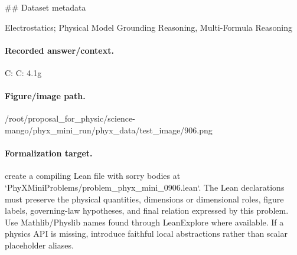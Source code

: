 \#\# Dataset metadata

Electrostatics; Physical Model Grounding Reasoning, Multi-Formula Reasoning

\paragraph{Recorded answer/context.}
C: C: 4.1g

\paragraph{Figure/image path.}
/root/proposal\_for\_physic/science-mango/phyx\_mini\_run/phyx\_data/test\_image/906.png

\paragraph{Formalization target.}
create a compiling Lean file with sorry bodies at `PhyXMiniProblems/problem\_phyx\_mini\_0906.lean`. The Lean declarations must preserve the physical quantities, dimensions or dimensional roles, figure labels, governing-law hypotheses, and final relation expressed by this problem.
Use Mathlib/Physlib names found through LeanExplore where available. If a physics API is missing, introduce faithful local abstractions rather than scalar placeholder aliases.

